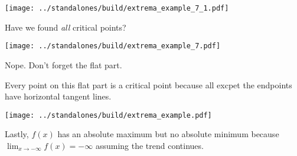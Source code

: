 \documentclass[12pt, handout]{beamer}
\begin{document}
\begin{frame}[t]
  \texttt{[image: ../standalones/build/extrema\_example\_7\_1.pdf]}
  
  \faComment{} Have we found \emph{all} critical points?
\end{frame}

\begin{frame}[t]
  \texttt{[image: ../standalones/build/extrema\_example\_7.pdf]}
  
  Nope. Don't forget the flat part. 

  Every point on this flat part is a critical point because all excpet the endpoints have horizontal tangent lines.
\end{frame}


\begin{frame}[t]
  \texttt{[image: ../standalones/build/extrema\_example.pdf]}

  Lastly, \(f(x)\) has an absolute maximum but no absolute minimum because \(\lim_{x \to -\infty} f(x) = -\infty\) assuming the trend continues.
\end{frame}
\end{document}
